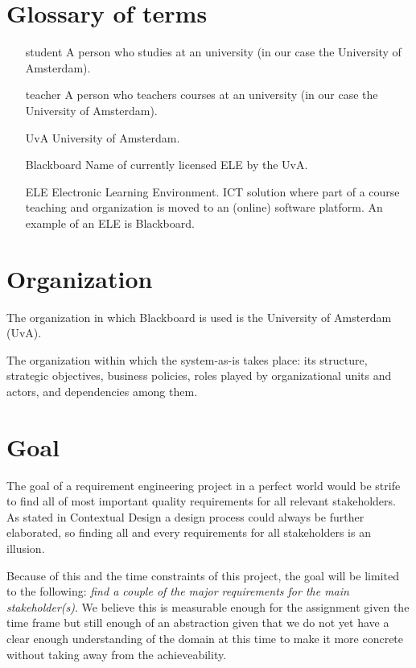 \section{Glossary of terms}
\begin{itemize}
	\item[student] A person who studies at an university (in our case the University of Amsterdam).
	\item[teacher] A person who teachers courses at an university (in our case the University of Amsterdam).
	\item[UvA] University of Amsterdam. 
	\item[Blackboard] Name of currently licensed ELE by the UvA. 
	\item[ELE] Electronic Learning Environment. ICT solution where part of a course teaching and organization is moved to an (online) software platform. An example of an ELE is Blackboard.
	
\end{itemize}

\section{Organization}
The organization in which Blackboard is used is the University of Amsterdam (UvA). 

The organization within which the system-as-is takes place: its structure, strategic objectives,
business policies, roles played by organizational units and actors, and dependencies
among them.

\section{Goal}
The goal of a requirement engineering project in a perfect world would be strife to find all of most important quality requirements for all relevant stakeholders. As stated in Contextual Design \cite{contextual_design} a design process could always be further elaborated, so finding all and every requirements for all stakeholders is an illusion.

Because of this and the time constraints of this project, the goal will be limited to the following: \emph{find a couple of the major requirements for the main stakeholder(s)}. We believe this is measurable enough for the assignment given the time frame but still enough of an abstraction given that we do not yet have a clear enough understanding of the domain at this time to make it more concrete without taking away from the achieveability.

